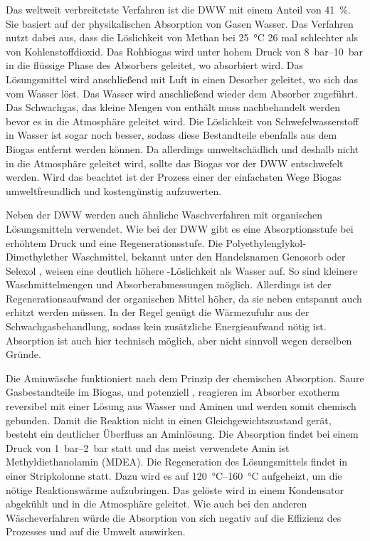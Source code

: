 Das weltweit verbreitetste Verfahren ist die \gls{DWW} mit einem Anteil von \SI{41}{\percent}. Sie basiert auf der physikalischen Absorption von Gasen Wasser. Das Verfahren nutzt dabei aus, dass die Löslichkeit von Methan bei \SI{25}{\degreeCelsius} \SI{26}{\relax} mal schlechter als von Kohlenstoffdioxid. Das Rohbiogas wird unter hohem Druck von \SIrange{8}{10}{\bar} in die flüssige Phase des Absorbers geleitet, wo  absorbiert wird. Das Lösungsmittel wird anschließend mit Luft in einen Desorber geleitet, wo sich das  vom Wasser löst. Das Wasser wird anschließend wieder dem Absorber zugeführt. Das Schwachgas, das kleine Mengen von  enthält muss nachbehandelt werden bevor es in die Atmosphäre geleitet wird.
Die Löslichkeit von Schwefelwasserstoff  in Wasser ist sogar noch besser, sodass diese Bestandteile ebenfalls aus dem Biogas entfernt werden können. Da  allerdings umweltschädlich und deshalb nicht in die Atmosphäre geleitet wird, sollte das Biogas vor der \gls{DWW} entschwefelt werden. Wird das beachtet ist der Prozess einer der einfachsten Wege Biogas umweltfreundlich und kostengünstig aufzuwerten. \parencite{KGKK2019} \parencite{BHPT13} \smallskip

Neben der \gls{DWW} werden auch ähnliche Waschverfahren mit organischen Lösungsmitteln verwendet. Wie bei der \gls{DWW} gibt es eine Absorptionsstufe bei erhöhtem Druck und eine Regenerationsstufe. Die Polyethylenglykol-Dimethylether Waschmittel, bekannt unter den Handelsnamen Genosorb \textsuperscript{\textregistered} oder Selexol \textsuperscript{\textregistered}, weisen eine deutlich höhere -Löslichkeit als Wasser auf. So sind kleinere Waschmittelmengen und Absorberabmessungen möglich. Allerdings ist der Regenerationsaufwand der organischen Mittel höher, da sie neben entspannt auch erhitzt werden müssen. In der Regel genügt die Wärmezufuhr aus der Schwachgasbehandlung, sodass kein zusätzliche Energieaufwand nötig ist.  Absorption ist auch hier technisch möglich, aber nicht sinnvoll wegen derselben Gründe. \parencite{FNR14} \smallskip

Die Aminwäsche funktioniert nach dem Prinzip der chemischen Absorption. Saure Gasbestandteile im Biogas,  und potenziell , reagieren im Absorber exotherm reversibel mit einer Lösung aus Wasser und Aminen und werden somit chemisch gebunden. Damit die Reaktion nicht in einen Gleichgewichtszustand gerät, besteht ein deutlicher Überfluss an Aminlösung. Die Absorption findet bei einem Druck von \SIrange{1}{2}{\bar} statt und das meist verwendete Amin ist Methyldiethanolamin (MDEA). Die Regeneration des Lösungsmittels findet in einer Stripkolonne statt. Dazu wird es auf \SIrange{120}{160}{\degreeCelsius} aufgeheizt, um die nötige Reaktionswärme aufzubringen. Das gelöste  wird in einem Kondensator abgekühlt und in die Atmosphäre geleitet. Wie auch bei den anderen Wäscheverfahren würde die Absorption von  sich negativ auf die Effizienz des Prozesses und auf die Umwelt auswirken. \parencite{BHPT13} \parencite{KGKK2019}


